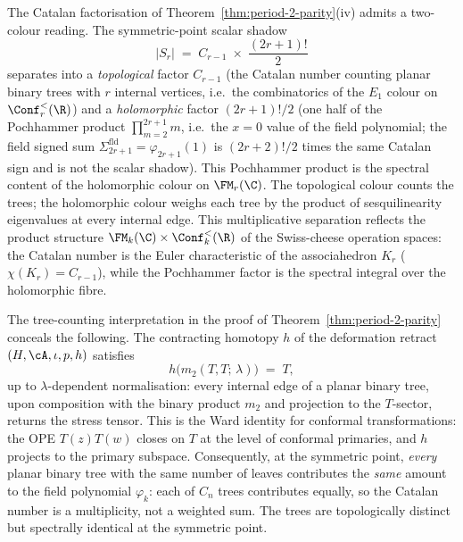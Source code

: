 \begin{remark}
\label{rem:sesquilinearity-two-colour}%
\label{rem:two-colour-factorisation}%
%
%
%
%
The Catalan
factorisation of
Theorem~\ref{thm:period-2-parity}(iv) admits a
two-colour reading. The symmetric-point scalar shadow
\[
|S_r|
\;=\;
C_{r-1} \;\times\; \frac{(2r+1)!}{2}
\]
separates into a \emph{topological} factor $C_{r-1}$
(the Catalan number counting planar binary trees with $r$
internal vertices, i.e.\ the combinatorics of the $E_1$
colour on $\Conf_r^<(\R)$) and a \emph{holomorphic} factor
$(2r+1)!/2$ (one half of the Pochhammer product
\(\prod_{m=2}^{2r+1}m\), i.e.\ the \(x=0\) value of the
field polynomial; the field signed sum
\(\Sigma_{2r+1}^{\mathrm{fld}}=\varphi_{2r+1}(1)\) is
\((2r+2)!/2\) times the same Catalan sign and is not the scalar
shadow).  This Pochhammer product is the spectral content of the
holomorphic colour on $\FM_r(\C)$.
The topological colour counts the trees; the holomorphic
colour weighs each tree by the product of sesquilinearity
eigenvalues at every internal edge. This
multiplicative separation reflects the product structure
$\FM_k(\C) \times \Conf_k^<(\R)$ of the Swiss-cheese
operation spaces: the Catalan number is the Euler
characteristic of the associahedron $K_r$
($\chi(K_r) = C_{r-1}$), while the Pochhammer factor is
the spectral integral over the holomorphic fibre.
\end{remark}

\begin{remark}
\label{rem:h-collapse-ward}%
%
%
The tree-counting interpretation in the proof of
Theorem~\ref{thm:period-2-parity} conceals the following.
The contracting homotopy $h$ of the deformation retract
$(H, \cA, \iota, p, h)$ satisfies
\begin{equation}\label{eq:h-collapse-ward}
h\bigl(m_2(T, T;\, \lambda)\bigr)
\;=\;
T,
\end{equation}
up to $\lambda$-dependent normalisation: every internal edge
of a planar binary tree, upon composition with the binary
product $m_2$ and projection to the $T$-sector, returns
the stress tensor. This is the Ward identity for conformal
transformations: the OPE $T(z)T(w)$ closes on $T$ at the
level of conformal primaries, and $h$ projects to the
primary subspace. Consequently, at the symmetric point,
\emph{every} planar binary tree with the same number of
leaves contributes the \emph{same} amount to the field
polynomial $\varphi_k$: each of $C_n$
trees contributes equally, so the Catalan number is a
multiplicity, not a weighted sum. The trees are topologically
distinct but spectrally identical at the symmetric point.
\end{remark}

